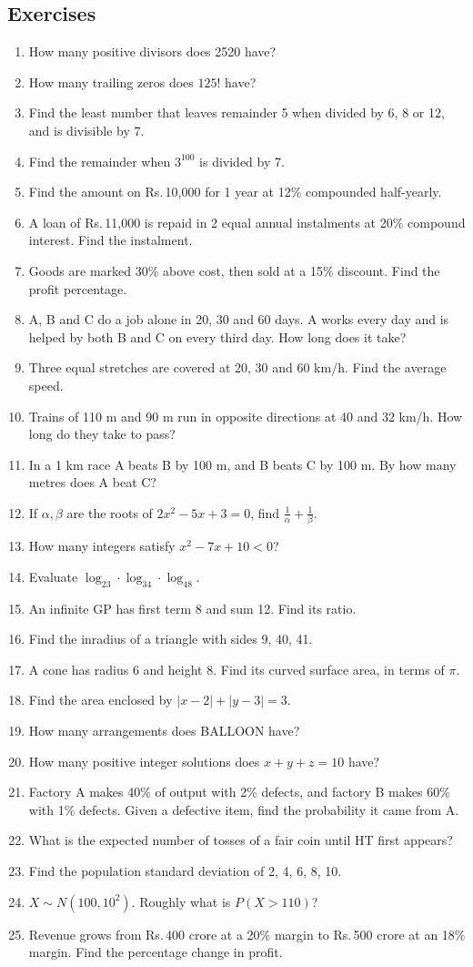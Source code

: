 \documentclass[11pt,a4paper,openany]{report}
\newenvironment{exercises}{\subsection*{Exercises \thechapter}\begin{enumerate}[label=\textbf{\thechapter.\arabic*},leftmargin=3.2em]}{\end{enumerate}}
\newcommand{\Rs}{Rs.\,}
\begin{document}
\begin{exercises}
\item How many positive divisors does 2520 have?
\item How many trailing zeros does $125!$ have?
\item Find the least number that leaves remainder 5 when divided by 6, 8 or 12, and is divisible by 7.
\item Find the remainder when $3^{100}$ is divided by 7.
\item Find the amount on \Rs10,000 for 1 year at 12\% compounded half-yearly.
\item A loan of \Rs11,000 is repaid in 2 equal annual instalments at 20\% compound interest. Find the instalment.
\item Goods are marked 30\% above cost, then sold at a 15\% discount. Find the profit percentage.
\item A, B and C do a job alone in 20, 30 and 60 days. A works every day and is helped by both B and C on every third day. How long does it take?
\item Three equal stretches are covered at 20, 30 and 60 km/h. Find the average speed.
\item Trains of 110 m and 90 m run in opposite directions at 40 and 32 km/h. How long do they take to pass?
\item In a 1 km race A beats B by 100 m, and B beats C by 100 m. By how many metres does A beat C?
\item If $\alpha,\beta$ are the roots of $2x^2-5x+3=0$, find $\frac1\alpha+\frac1\beta$.
\item How many integers satisfy $x^2-7x+10<0$?
\item Evaluate $\log_23\cdot\log_34\cdot\log_48$.
\item An infinite GP has first term 8 and sum 12. Find its ratio.
\item Find the inradius of a triangle with sides 9, 40, 41.
\item A cone has radius 6 and height 8. Find its curved surface area, in terms of $\pi$.
\item Find the area enclosed by $|x-2|+|y-3|=3$.
\item How many arrangements does BALLOON have?
\item How many positive integer solutions does $x+y+z=10$ have?
\item Factory A makes 40\% of output with 2\% defects, and factory B makes 60\% with 1\% defects. Given a defective item, find the probability it came from A.
\item What is the expected number of tosses of a fair coin until HT first appears?
\item Find the population standard deviation of 2, 4, 6, 8, 10.
\item $X\sim N(100,10^2)$. Roughly what is $P(X>110)$?
\item Revenue grows from \Rs400 crore at a 20\% margin to \Rs500 crore at an 18\% margin. Find the percentage change in profit.
\end{exercises}
\end{document}
